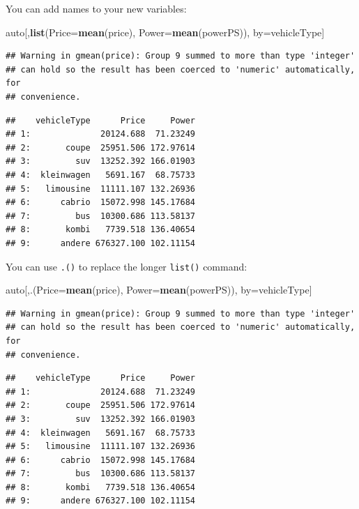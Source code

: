 \documentclass[]{book}
\newenvironment{Shaded}{\begin{snugshade}}{\end{snugshade}}
\newcommand{\KeywordTok}[1]{\textcolor[rgb]{0.13,0.29,0.53}{\textbf{#1}}}
\newcommand{\DataTypeTok}[1]{\textcolor[rgb]{0.13,0.29,0.53}{#1}}
\newcommand{\NormalTok}[1]{#1}
\theoremstyle{definition}
\theoremstyle{definition}
\theoremstyle{definition}
\theoremstyle{remark}
\begin{document}
You can add names to your new variables:

\begin{Shaded}
\begin{Highlighting}[]
\NormalTok{auto[,}\KeywordTok{list}\NormalTok{(}\DataTypeTok{Price=}\KeywordTok{mean}\NormalTok{(price), }\DataTypeTok{Power=}\KeywordTok{mean}\NormalTok{(powerPS)), by=vehicleType]}
\end{Highlighting}
\end{Shaded}

\begin{verbatim}
## Warning in gmean(price): Group 9 summed to more than type 'integer'
## can hold so the result has been coerced to 'numeric' automatically, for
## convenience.
\end{verbatim}

\begin{verbatim}
##    vehicleType      Price     Power
## 1:              20124.688  71.23249
## 2:       coupe  25951.506 172.97614
## 3:         suv  13252.392 166.01903
## 4:  kleinwagen   5691.167  68.75733
## 5:   limousine  11111.107 132.26936
## 6:      cabrio  15072.998 145.17684
## 7:         bus  10300.686 113.58137
## 8:       kombi   7739.518 136.40654
## 9:      andere 676327.100 102.11154
\end{verbatim}

You can use \texttt{.()} to replace the longer \texttt{list()} command:

\begin{Shaded}
\begin{Highlighting}[]
\NormalTok{auto[,.(}\DataTypeTok{Price=}\KeywordTok{mean}\NormalTok{(price), }\DataTypeTok{Power=}\KeywordTok{mean}\NormalTok{(powerPS)), by=vehicleType]}
\end{Highlighting}
\end{Shaded}

\begin{verbatim}
## Warning in gmean(price): Group 9 summed to more than type 'integer'
## can hold so the result has been coerced to 'numeric' automatically, for
## convenience.
\end{verbatim}

\begin{verbatim}
##    vehicleType      Price     Power
## 1:              20124.688  71.23249
## 2:       coupe  25951.506 172.97614
## 3:         suv  13252.392 166.01903
## 4:  kleinwagen   5691.167  68.75733
## 5:   limousine  11111.107 132.26936
## 6:      cabrio  15072.998 145.17684
## 7:         bus  10300.686 113.58137
## 8:       kombi   7739.518 136.40654
## 9:      andere 676327.100 102.11154
\end{verbatim}
\end{document}

